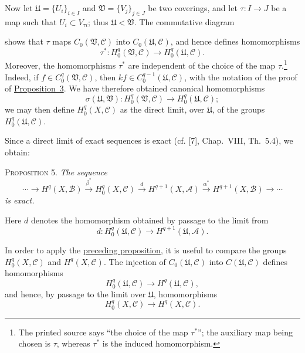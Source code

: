 Now let $\mathfrak{U}=\{U_i\}_{i\in I}$ and $\mathfrak{V}=\{V_j\}_{j\in J}$ be two coverings, and let $\tau:I\to J$ be a map such that $U_i\subset V_{\tau i}$; thus $\mathfrak{U}<\mathfrak{V}$. The commutative diagram
\begin{center}
\end{center}
shows that $\tau$ maps $C_0(\mathfrak{V},\mathcal{C})$ into $C_0(\mathfrak{U},\mathcal{C})$, and hence defines homomorphisms
\[
\tau^*:H_0^q(\mathfrak{V},\mathcal{C})
\longrightarrow H_0^q(\mathfrak{U},\mathcal{C}).
\]
Moreover, the homomorphisms $\tau^*$ are independent of the choice of the map $\tau$.\footnote{The printed source says ``the choice of the map $\tau^*$''; the auxiliary map being chosen is $\tau$, whereas $\tau^*$ is the induced homomorphism.} Indeed, if $f\in C_0^q(\mathfrak{V},\mathcal{C})$, then $kf\in C_0^{q-1}(\mathfrak{U},\mathcal{C})$, with the notation of the proof of \hyperref[fac:I:3:no:21:prop:3]{Proposition~3}. We have therefore obtained canonical homomorphisms
\[
\sigma(\mathfrak{U},\mathfrak{V}):
H_0^q(\mathfrak{V},\mathcal{C})
\longrightarrow H_0^q(\mathfrak{U},\mathcal{C});
\]
we may then define $H_0^q(X,\mathcal{C})$ as the direct limit, over $\mathfrak{U}$, of the groups $H_0^q(\mathfrak{U},\mathcal{C})$.

Since a direct limit of exact sequences is exact (cf. [7], Chap.~VIII, Th.~5.4), we obtain:

\label{fac:I:3:no:24:prop:5}
\textsc{Proposition 5.} \textit{The sequence}
\[
\cdots\longrightarrow H^q(X,\mathcal{B})
\xrightarrow{\beta^*}H_0^q(X,\mathcal{C})
\xrightarrow{d}H^{q+1}(X,\mathcal{A})
\xrightarrow{\alpha^*}H^{q+1}(X,\mathcal{B})
\longrightarrow\cdots
\]
\textit{is exact.}

Here $d$ denotes the homomorphism obtained by passage to the limit from
\[
d:H_0^q(\mathfrak{U},\mathcal{C})
\longrightarrow H^{q+1}(\mathfrak{U},\mathcal{A}).
\]

In order to apply the \hyperref[fac:I:3:no:24:prop:5]{preceding proposition}, it is useful to compare the groups $H_0^q(X,\mathcal{C})$ and $H^q(X,\mathcal{C})$. The injection of $C_0(\mathfrak{U},\mathcal{C})$ into $C(\mathfrak{U},\mathcal{C})$ defines homomorphisms
\[
H_0^q(\mathfrak{U},\mathcal{C})\longrightarrow H^q(\mathfrak{U},\mathcal{C}),
\]
and hence, by passage to the limit over $\mathfrak{U}$, homomorphisms
\[
H_0^q(X,\mathcal{C})\longrightarrow H^q(X,\mathcal{C}).
\]

